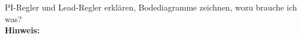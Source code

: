 \begin{question}[section=5,name={Regler},difficulty=,type=mdl,tags={}]
	PI-Regler und Lead-Regler erklären, Bodediagramme zeichnen, wozu brauche ich was?
	\\ \textbf{Hinweis:}\\
	
\end{question}
\begin{solution}
	
\end{solution}